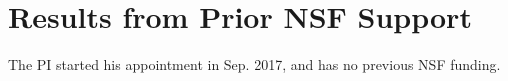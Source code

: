 \section{Results from Prior NSF Support}
\label{sec:prior}

The PI started his appointment in Sep. 2017, and has no previous NSF funding.
